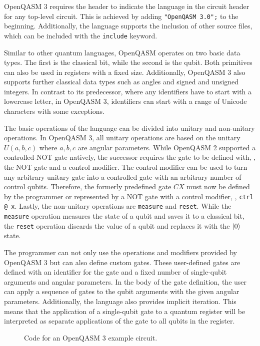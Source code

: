 OpenQASM 3 requires the header to indicate the language in the circuit header for any top-level circuit. This is achieved by adding \texttt{"OpenQASM 3.0";} to the beginning. Additionally, the language supports the inclusion of other source files, which can be included with the \texttt{include} keyword.

Similar to other quantum languages, OpenQASM operates on two basic data types. The first is the classical bit, while the second is the qubit. Both primitives can also be used in registers with a fixed size. Additionally, OpenQASM 3 also supports further classical data types such as angles and signed and unsigned integers.
In contrast to its predecessor, where any identifiers have to start with a lowercase letter, in OpenQASM 3, identifiers can start with a range of Unicode characters with some exceptions. 

The basic operations of the language can be divided into unitary and non-unitary operations. In OpenQASM 3, all unitary operations are based on the unitary $U(a,b,c)$ where $a,b,c$ are angular parameters.
While OpenQASM 2 supported a controlled-NOT gate natively, the successor requires the gate to be defined with, \eg, the NOT gate and a control modifier. The control modifier can be used to turn any arbitrary unitary gate into a controlled gate with an arbitrary number of control qubits. Therefore, the formerly predefined gate $CX$ must now be defined by the programmer or represented by a NOT gate with a control modifier, \eg, \texttt{ctrl @ x}. Lastly, the non-unitary operations are \texttt{measure} and \texttt{reset}. While the \texttt{measure} operation measures the state of a qubit and saves it to a classical bit, the \texttt{reset} operation discards the value of a qubit and replaces it with the $\ket{0}$ state.

The programmer can not only use the operations and modifiers provided by OpenQASM 3 but can also define custom gates. These user-defined gates are defined with an identifier for the gate and a fixed number of single-qubit arguments and angular parameters. In the body of the gate definition, the user can apply a sequence of gates to the qubit arguments with the given angular parameters. Additionally, the language also provides implicit iteration. This means that the application of a single-qubit gate to a quantum register will be interpreted as separate applications of the gate to all qubits in the register.

\begin{figure}[htp]
    \centering     
    
    \caption{Code for an OpenQASM 3 example circuit.}
    \label{fig:qasm_example}
\end{figure}


